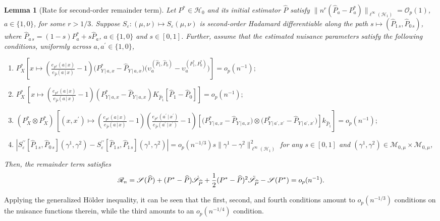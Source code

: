 \documentclass{article}
\theoremstyle{plain}
\newtheorem{lemma}[theorem]{Lemma}
\theoremstyle{definition}
\theoremstyle{remark}
\newcommand{\of}[1]{\left(#1\right)}
\newcommand{\off}[1]{\left[#1\right]}
\newcommand{\abs}[1]{\left|#1\right|}
\newcommand{\cH}{\mathcal{H}}
\newcommand{\cO}{\mathcal{O}}
\newcommand{\cM}{\mathcal{M}}
\newcommand{\ucH}{\mathscr{H}}
\newcommand{\ucR}{\mathscr{R}}
\newcommand{\hP}{\widehat{P}}
\newcommand{\1}{\mathbbm{1}}
\newcommand{\STE}{\mathscr{S}}
\newcommand{\eps}{\varepsilon}
\theoremstyle{plain}
\theoremstyle{definition}
\newcommand{\mymid}{\,|\,}
\begin{document}
\begin{lemma}[Rate for second-order remainder term]\label{lem:remainder_term}
   Let $P^* \in \ucH_0$ and its initial estimator $\hP$ satisfy $\|n^r (\hP_a - P_a^*)\|_{\ell^\infty(\cH_1)} = \cO_p(1)$, $a \in \{1,0\}$, for some $r > 1/3$. Suppose $S_\eps: (\mu, \nu) \mapsto S_\eps(\mu, \nu)$ is second-order Hadamard differentiable along the path $s \mapsto (\hP_{1\,s}, \hP_{0\,s})$, where $\hP_{a\,s} = (1-s)P_a^*+s\hP_a$, $a \in \{1,0\}$ and $s \in [0,1]$. Further, assume that the estimated nuisance parameters satisfy the following conditions, uniformly across $a, a^\prime \in \{1,0\}$,
    \begin{enumerate}
        \item $P^*_{X}\off{x \mapsto \of{\frac{e_{P^*}(a \mymid x)}{e_{\hP}(a \mymid x)}-1} \big({P^*_{Y \mymid a, x} - \hP_{Y \mymid a, x}}\big) \big(\upsilon_a^{(\hP_1, \hP_0)} - \upsilon_a^{(P^*_1, P^*_0)}\big)} = o_p(n^{-1});$
        \item $P^*_X \, \off{x \mapsto \of{\frac{e_{P^*}(a \mymid x)}{e_{\hP}(a \mymid x)}-1} \of{P^*_{Y \mymid a, x} - \hP_{Y \mymid a, x}} K_{\hP_1}[\hP_{1} - \hP_{0}]} = o_p(n^{-1});$
        \item $(P^*_X \otimes P^*_{X}) \,\off{(x, x^\prime) \mapsto \of{\frac{e_{P^*}(a \mymid x)}{e_{\hP}(a \mymid x)}-1} \of{\frac{e_{P^*}(a^\prime \mymid x^\prime)}{e_{\hP}(a^\prime \mymid x^\prime)}-1}  \off{\big({P^*_{Y \mymid a, x} - \hP_{Y \mymid a, x}}\big) \otimes \big({P^*_{Y \mymid a^\prime, x^\prime} - \hP_{Y \mymid a^\prime, x^\prime}}\big)} k_{\hP_1}} = o_p(n^{-1});$
        \item $\abs{S_\eps^{\prime\prime}[\hP_{1\,s}, \hP_{0\,s}](\gamma^1, \gamma^2) - S_\eps^{\prime\prime}[\hP_{1\,s}, \hP_{1\,s}](\gamma^1, \gamma^2)} = o_p(n^{-1/3}) s \|\gamma^1 - \gamma^2\|^2_{\ell^\infty(\cH_1 )}$ for any $s \in [0,1]$ and $(\gamma^1, \gamma^2) \in \cM_{0, \mu} \times \cM_{0, \mu}$, 
    \end{enumerate} 
    Then, the remainder term satisfies
    \[
    \ucR_n = \STE(\hP) + (P^* - \hP)\dot{\STE}_{\hP} + \frac{1}{2} (P^* - \hP)^2\Ddot{\STE}_{\hP} - \STE(P^*) = o_p(n^{-1}).
    \]
\end{lemma}
Applying the generalized H\"{o}lder inequality, it can be seen that the first, second, and fourth conditions amount to $o_p(n^{-1/3})$ conditions on the nuisance functions therein, while the third amounts to an $o_p(n^{-1/4})$ condition.
\end{document}
